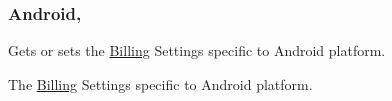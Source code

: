 \subsubsection[{Android}]{ Android\hspace{0.3cm}{\ttfamily [get]}, {\ttfamily [set]}}\label{class_voxel_busters_1_1_native_plugins_1_1_billing_settings_a1c2d6ed884eda0a6f3e7bb4913332b0a}


Gets or sets the \hyperlink{class_voxel_busters_1_1_native_plugins_1_1_billing}{Billing} Settings specific to Android platform. 

The \hyperlink{class_voxel_busters_1_1_native_plugins_1_1_billing}{Billing} Settings specific to Android platform.